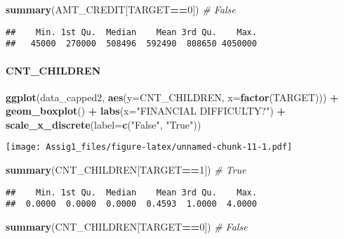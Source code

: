 \documentclass[
]{article}
\newenvironment{Shaded}{\begin{snugshade}}{\end{snugshade}}
\newcommand{\AttributeTok}[1]{\textcolor[rgb]{0.13,0.29,0.53}{#1}}
\newcommand{\CommentTok}[1]{\textcolor[rgb]{0.56,0.35,0.01}{\textit{#1}}}
\newcommand{\DecValTok}[1]{\textcolor[rgb]{0.00,0.00,0.81}{#1}}
\newcommand{\FunctionTok}[1]{\textcolor[rgb]{0.13,0.29,0.53}{\textbf{#1}}}
\newcommand{\NormalTok}[1]{#1}
\newcommand{\SpecialCharTok}[1]{\textcolor[rgb]{0.81,0.36,0.00}{\textbf{#1}}}
\newcommand{\StringTok}[1]{\textcolor[rgb]{0.31,0.60,0.02}{#1}}
\begin{document}
\begin{Shaded}
\begin{Highlighting}[]
\FunctionTok{summary}\NormalTok{(AMT\_CREDIT[TARGET}\SpecialCharTok{==}\DecValTok{0}\NormalTok{]) }\CommentTok{\# False}
\end{Highlighting}
\end{Shaded}

\begin{verbatim}
##    Min. 1st Qu.  Median    Mean 3rd Qu.    Max. 
##   45000  270000  508496  592490  808650 4050000
\end{verbatim}

\hypertarget{cnt_children-1}{%
\paragraph{CNT\_CHILDREN}\label{cnt_children-1}}

\begin{Shaded}
\begin{Highlighting}[]
\FunctionTok{ggplot}\NormalTok{(data\_capped2, }\FunctionTok{aes}\NormalTok{(}\AttributeTok{y=}\NormalTok{CNT\_CHILDREN, }\AttributeTok{x=}\FunctionTok{factor}\NormalTok{(TARGET))) }\SpecialCharTok{+}
  \FunctionTok{geom\_boxplot}\NormalTok{() }\SpecialCharTok{+}
  \FunctionTok{labs}\NormalTok{(}\AttributeTok{x=}\StringTok{"FINANCIAL DIFFICULTY?"}\NormalTok{) }\SpecialCharTok{+}
  \FunctionTok{scale\_x\_discrete}\NormalTok{(}\AttributeTok{label=}\FunctionTok{c}\NormalTok{(}\StringTok{"False"}\NormalTok{, }\StringTok{"True"}\NormalTok{))}
\end{Highlighting}
\end{Shaded}

\texttt{[image: Assig1\_files/figure-latex/unnamed-chunk-11-1.pdf]}

\begin{Shaded}
\begin{Highlighting}[]
\FunctionTok{summary}\NormalTok{(CNT\_CHILDREN[TARGET}\SpecialCharTok{==}\DecValTok{1}\NormalTok{]) }\CommentTok{\# True}
\end{Highlighting}
\end{Shaded}

\begin{verbatim}
##    Min. 1st Qu.  Median    Mean 3rd Qu.    Max. 
##  0.0000  0.0000  0.0000  0.4593  1.0000  4.0000
\end{verbatim}

\begin{Shaded}
\begin{Highlighting}[]
\FunctionTok{summary}\NormalTok{(CNT\_CHILDREN[TARGET}\SpecialCharTok{==}\DecValTok{0}\NormalTok{]) }\CommentTok{\# False}
\end{Highlighting}
\end{Shaded}
\end{document}
